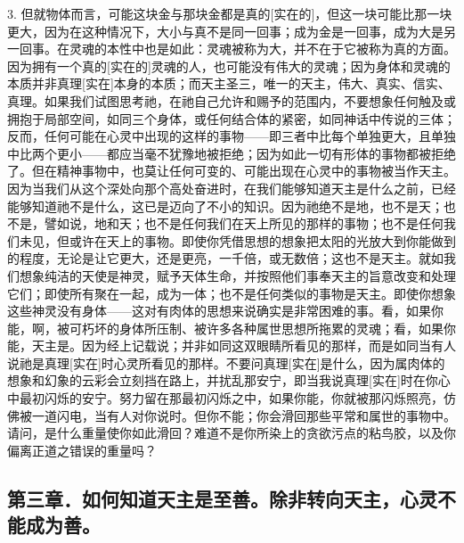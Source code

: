 3. 但就物体而言，可能这块金与那块金都是真的[实在的]，但这一块可能比那一块更大，因为在这种情况下，大小与真不是同一回事；成为金是一回事，成为大是另一回事。在灵魂的本性中也是如此：灵魂被称为大，并不在于它被称为真的方面。因为拥有一个真的[实在的]灵魂的人，也可能没有伟大的灵魂；因为身体和灵魂的本质并非真理[实在]本身的本质；而天主圣三，唯一的天主，伟大、真实、信实、真理。如果我们试图思考祂，在祂自己允许和赐予的范围内，不要想象任何触及或拥抱于局部空间，如同三个身体，或任何结合体的紧密，如同神话中传说的三体；反而，任何可能在心灵中出现的这样的事物——即三者中比每个单独更大，且单独中比两个更小——都应当毫不犹豫地被拒绝；因为如此一切有形体的事物都被拒绝了。但在精神事物中，也莫让任何可变的、可能出现在心灵中的事物被当作天主。因为当我们从这个深处向那个高处奋进时，在我们能够知道天主是什么之前，已经能够知道祂不是什么，这已是迈向了不小的知识。因为祂绝不是地，也不是天；也不是，譬如说，地和天；也不是任何我们在天上所见的那样的事物；也不是任何我们未见，但或许在天上的事物。即使你凭借思想的想象把太阳的光放大到你能做到的程度，无论是让它更大，还是更亮，一千倍，或无数倍；这也不是天主。就如我们想象纯洁的天使是神灵，赋予天体生命，并按照他们事奉天主的旨意改变和处理它们；即使所有聚在一起，成为一体；也不是任何类似的事物是天主。即使你想象这些神灵没有身体——这对有肉体的思想来说确实是非常困难的事。看，如果你能，啊，被可朽坏的身体所压制、被许多各种属世思想所拖累的灵魂；看，如果你能，天主是。因为经上记载说；并非如同这双眼睛所看见的那样，而是如同当有人说祂是真理[实在]时心灵所看见的那样。不要问真理[实在]是什么，因为属肉体的想象和幻象的云彩会立刻挡在路上，并扰乱那安宁，即当我说真理[实在]时在你心中最初闪烁的安宁。努力留在那最初闪烁之中，如果你能，你就被那闪烁照亮，仿佛被一道闪电，当有人对你说时。但你不能；你会滑回那些平常和属世的事物中。请问，是什么重量使你如此滑回？难道不是你所染上的贪欲污点的粘鸟胶，以及你偏离正道之错误的重量吗？\par


\subsection{第三章．如何知道天主是至善。除非转向天主，心灵不能成为善。}

